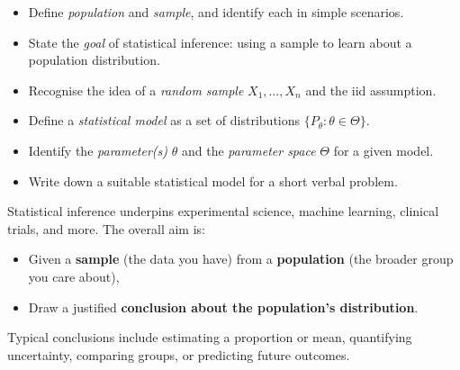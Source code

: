 \documentclass[
  letterpaper,
  DIV=11,
  numbers=noendperiod]{scrreprt}
\providecommand{\tightlist}{%
  \setlength{\itemsep}{0pt}\setlength{\parskip}{0pt}}
\theoremstyle{definition}
\theoremstyle{plain}
\theoremstyle{definition}
\theoremstyle{remark}
\begin{document}
\begin{tcolorbox}[enhanced jigsaw, left=2mm, toprule=.15mm, breakable, opacityback=0, titlerule=0mm, toptitle=1mm, colbacktitle=quarto-callout-note-color!10!white, colframe=quarto-callout-note-color-frame, coltitle=black, rightrule=.15mm, leftrule=.75mm, bottomrule=.15mm, arc=.35mm, bottomtitle=1mm, title=\textcolor{quarto-callout-note-color}{\faInfo}\hspace{0.5em}{Learning objectives}, colback=white, opacitybacktitle=0.6]

\begin{itemize}
\tightlist
\item
  Define \emph{population} and \emph{sample}, and identify each in
  simple scenarios.
\item
  State the \emph{goal} of statistical inference: using a sample to
  learn about a population distribution.
\item
  Recognise the idea of a \emph{random sample} \(X_1,\dots,X_n\) and the
  iid assumption.
\item
  Define a \emph{statistical model} as a set of distributions
  \(\{P_\theta:\theta\in\Theta\}\).
\item
  Identify the \emph{parameter(s)} \(\theta\) and the \emph{parameter
  space} \(\Theta\) for a given model.
\item
  Write down a suitable statistical model for a short verbal problem.
\end{itemize}

\end{tcolorbox}

Statistical inference underpins experimental science, machine learning,
clinical trials, and more. The overall aim is:

\begin{itemize}
\tightlist
\item
  Given a \textbf{sample} (the data you have) from a \textbf{population}
  (the broader group you care about),
\item
  Draw a justified \textbf{conclusion about the population's
  distribution}.
\end{itemize}

Typical conclusions include estimating a proportion or mean, quantifying
uncertainty, comparing groups, or predicting future outcomes.
\end{document}
